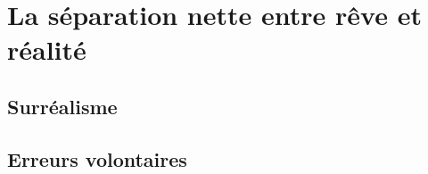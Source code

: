 \documentclass[../main.tex]{subfile}
\begin{document}
\section{La séparation nette entre rêve et réalité}

\subsection{Surréalisme}
\subsection{Erreurs volontaires}
\end{document}

